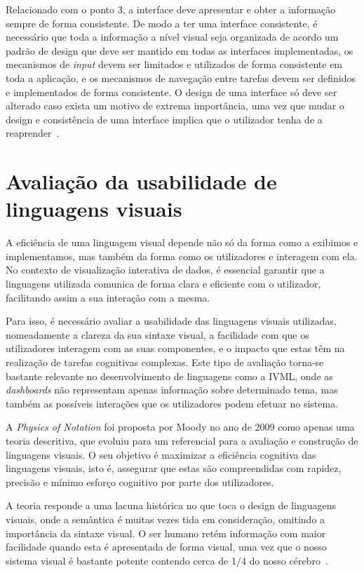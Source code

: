 Relacionado com o ponto 3, a interface deve apresentar e obter a informação sempre de forma consistente. De modo a ter uma interface consistente, é necessário que toda a informação a nível visual seja organizada de acordo um padrão de design que deve ser mantido em todas as interfaces implementadas, os mecanismos de \textit{input} devem ser limitados e utilizados de forma consistente em toda a aplicação, e os mecanismos de navegação entre tarefas devem ser definidos e implementados de forma consistente. O design de uma interface só deve ser alterado caso exista um motivo de extrema importância, uma vez que mudar o design e consistência de uma interface implica que o utilizador tenha de a reaprender~\cite{sridevi2014user}.

\section{Avaliação da usabilidade de linguagens visuais} %
\label{sec:avaliacao_usabilidade}

A eficiência de uma linguagem visual depende não só da forma como a exibimos e implementamos, mas também da forma como os utilizadores e interagem com ela. No contexto de visualização interativa de dados, é essencial garantir que a linguagens utilizada comunica de forma clara e eficiente com o utilizador, facilitando assim a sua interação com a mesma. 

Para isso, é necessário avaliar a usabilidade das linguagens visuais utilizadas, nomeadamente a clareza da sua sintaxe visual, a facilidade com que os utilizadores interagem com as suas componentes, e o impacto que estas têm na realização de tarefas cognitivas complexas. Este tipo de avaliação torna-se bastante relevante no desenvolvimento de linguagens como a \gls{IVML}, onde as \textit{dashboards} não representam apenas informação sobre determinado tema, mas também as possíveis interações que os utilizadores podem efetuar no sistema.

A \textit{Physics of Notation} foi proposta por Moody no ano de 2009 como apenas uma teoria descritiva, que evoluiu para um referencial para a avaliação e construção de linguagens visuais. O seu objetivo é maximizar a eficiência cognitiva das linguagens visuais, isto é, assegurar que estas são compreendidas com rapidez, precisão e mínimo esforço cognitivo por parte dos utilizadores. 

A teoria responde a uma lacuna histórica no que toca o design de linguagens visuais, onde a semântica é muitas vezes tida em consideração, omitindo a importância da sintaxe visual. O ser humano retém informação com maior facilidade quando esta é apresentada de forma visual, uma vez que o nosso sistema visual é bastante potente contendo cerca de 1/4 do nosso cérebro~\cite{moody2009physics}. %


